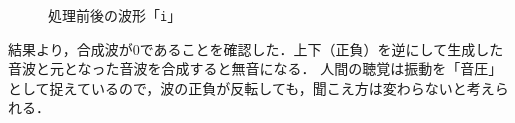 \begin{figure}[h]
\begin{minipage}[b]{.48\textwidth}
        \caption{処理前後の波形「\texttt{i}」}
        \label{fig:処理前後の波形_i}
    \end{minipage}
\end{figure}
\consideration
結果より，合成波が\(0\)であることを確認した．上下（正負）を逆にして生成した音波と元となった音波を合成すると無音になる．
人間の聴覚は振動を「音圧」として捉えているので，波の正負が反転しても，聞こえ方は変わらないと考えられる．